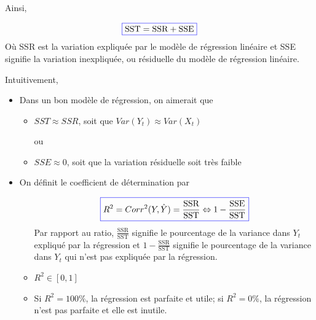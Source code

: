 \documentclass[11pt,french]{report}
\begin{document}
Ainsi, 

\begin{equation}
\label{eq:SST}
\color{blue}
\boxed{\color{black}
\text{SST} = \text{SSR} + \text{SSE}}
\end{equation}
Où SSR est la variation expliquée par le modèle de régression linéaire et SSE signifie la variation inexpliquée, ou résiduelle du modèle de régression linéaire.
\bigskip

Intuitivement, 
\begin{itemize}
     \item Dans un bon modèle de régression, on aimerait que 
          \begin{itemize}
          \item $SST \approx SSR$, soit que $Var(Y_t) \approx Var(X_t)$ 
          \item[ou]
          \item $SSE \approx 0$, soit que la variation résiduelle soit très faible
          \end{itemize}
     \item On définit le coefficient de détermination par
          \begin{itemize}
          
          \item[]\begin{equation}
          \label{eq:R}
          \color{blue}
          \boxed{\color{black}
          R^2 = Corr^2(Y, \hat{Y}) = \frac{\text{SSR}}{\text{SST}} \Leftrightarrow 1 - \frac{\text{SSE}}{\text{SST}}}
          \end{equation}
          Par rapport au ratio, $\frac{\text{SSR}}{\text{SST}}$ signifie le pourcentage de la variance dans $Y_t$ expliqué par la régression et 
          $1 - \frac{\text{SSR}}{\text{SST}}$ signifie le pourcentage de la variance dans $Y_t$ qui n'est pas expliquée par la régression.
          \item $R^2 \in [0,1] $
          \item Si $R^2 = 100 \%$, la régression est parfaite et utile; si $R^2 = 0 \%$, la régression n'est pas parfaite et elle est inutile.
          \end{itemize}
\end{itemize}
\end{document}
